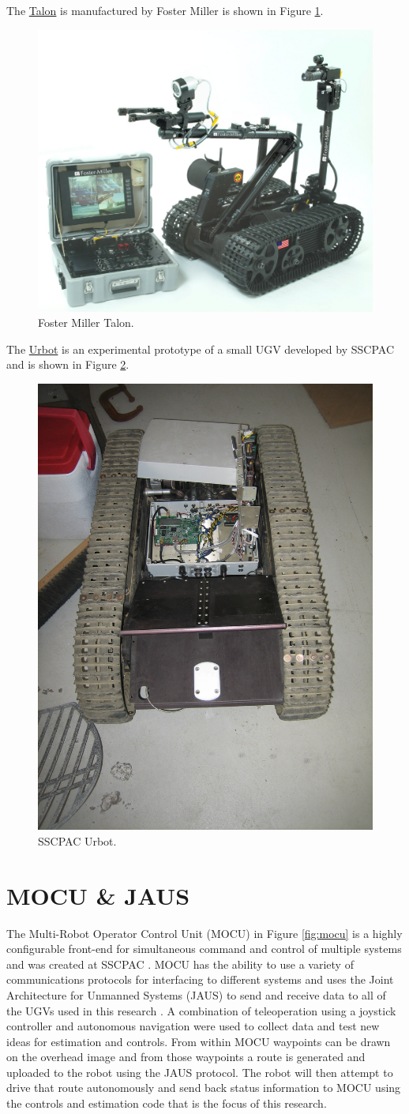 The \href{http://www.foster-miller.com/lemming.htm}{Talon} is manufactured by Foster Miller is shown in Figure \ref{fig:talon}.

\begin{figure}[ht!]
	\centering
	\includegraphics[width=.3\textwidth]{images/talon}
	\caption{Foster Miller Talon.}
	\label{fig:talon}
\end{figure}

The \href{http://www.spawar.navy.mil/robots/land/mprs/mprs.html}{Urbot} is an experimental prototype of a small UGV developed by SSCPAC and is shown in Figure \ref{fig:urbot}.

\begin{figure}[ht!]
	\centering
	\includegraphics[width=.3\textwidth]{images/urbot}
	\caption{SSCPAC Urbot.}
	\label{fig:urbot}
\end{figure}

\section{MOCU \& JAUS}
\label{sec:mocujaus}
The Multi-Robot Operator Control Unit (MOCU) in Figure \ref{fig:mocu} is a highly configurable front-end for simultaneous command and control of multiple systems and was created at SSCPAC \cite{PowellMOCU08}. MOCU has the ability to use a variety of communications protocols for interfacing to different systems and uses the Joint Architecture for Unmanned Systems (JAUS) to send and receive data to all of the UGVs used in this research \cite{RoweJAUS08}. A combination of teleoperation using a joystick controller and autonomous navigation were used to collect data and test new ideas for estimation and controls. From within MOCU waypoints can be drawn on the overhead image and from those waypoints a route is generated and uploaded to the robot using the JAUS protocol. The robot will then attempt to drive that route autonomously and send back status information to MOCU using the controls and estimation code that is the focus of this research.


